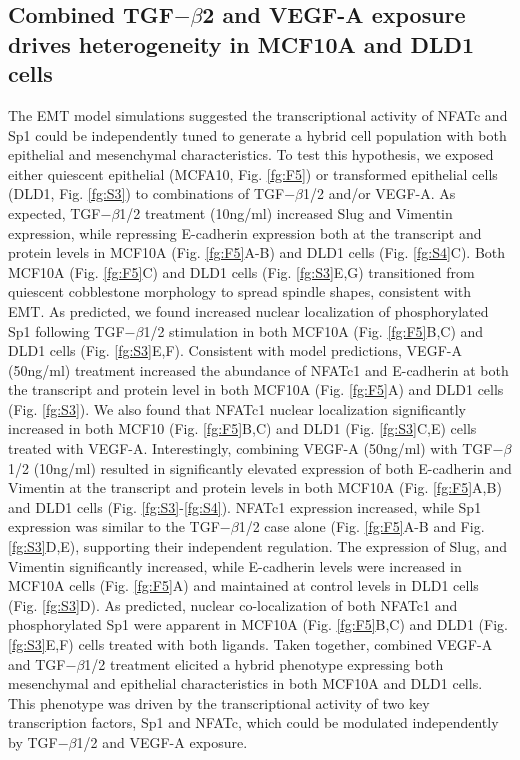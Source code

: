\documentclass[11pt,letterpaper]{article}
\begin{document}
\clearpage

\subsection*{Combined TGF$-\beta$2 and VEGF-A exposure drives heterogeneity in MCF10A and DLD1 cells}
The EMT model simulations suggested the transcriptional activity of NFATc and Sp1 could be independently tuned to generate a hybrid cell population with both epithelial and mesenchymal characteristics.
To test this hypothesis, we exposed either quiescent epithelial (MCFA10, Fig. \ref{fg:F5}) or transformed epithelial cells (DLD1, Fig. \ref{fg:S3}) to combinations of TGF$-\beta$1/2 and/or VEGF-A. As expected, TGF$-\beta$1/2 treatment (10ng/ml) increased Slug and Vimentin expression, while repressing E-cadherin expression both at the transcript and protein levels in MCF10A (Fig. \ref{fg:F5}A-B) and DLD1 cells (Fig. \ref{fg:S4}C).
Both MCF10A (Fig. \ref{fg:F5}C) and DLD1 cells (Fig. \ref{fg:S3}E,G) transitioned from quiescent cobblestone morphology to spread spindle shapes, consistent with EMT.
As predicted, we found increased nuclear localization of phosphorylated Sp1 following TGF$-\beta$1/2 stimulation in both MCF10A (Fig. \ref{fg:F5}B,C) and DLD1 cells (Fig. \ref{fg:S3}E,F).
Consistent with model predictions, VEGF-A (50ng/ml) treatment increased the abundance of NFATc1 and E-cadherin at both the transcript and protein level in both MCF10A (Fig. \ref{fg:F5}A) and DLD1 cells (Fig. \ref{fg:S3}).
We also found that NFATc1 nuclear localization significantly increased in both MCF10 (Fig. \ref{fg:F5}B,C) and DLD1 (Fig. \ref{fg:S3}C,E) cells treated with VEGF-A.
Interestingly, combining VEGF-A (50ng/ml) with TGF$-\beta$1/2 (10ng/ml) resulted in significantly elevated expression of both E-cadherin and Vimentin at the transcript and protein levels in both MCF10A (Fig. \ref{fg:F5}A,B) and DLD1 cells (Fig. \ref{fg:S3}-\ref{fg:S4}).
NFATc1 expression increased, while Sp1 expression was similar to the TGF$-\beta$1/2 case alone (Fig. \ref{fg:F5}A-B and Fig. \ref{fg:S3}D,E),
supporting their independent regulation.
The expression of Slug, and Vimentin significantly increased, while E-cadherin levels were increased in MCF10A cells (Fig. \ref{fg:F5}A) and maintained at control levels in DLD1 cells
(Fig. \ref{fg:S3}D).
As predicted, nuclear co-localization of both NFATc1 and phosphorylated Sp1 were apparent in MCF10A (Fig. \ref{fg:F5}B,C) and DLD1 (Fig. \ref{fg:S3}E,F) cells treated with both ligands.
Taken together, combined VEGF-A and TGF$-\beta$1/2 treatment elicited a hybrid phenotype expressing both mesenchymal and epithelial characteristics in both MCF10A and DLD1 cells.
This phenotype was driven by the transcriptional activity of two key transcription factors, Sp1 and NFATc, which could be modulated independently by TGF$-\beta$1/2 and VEGF-A exposure.
\end{document}
